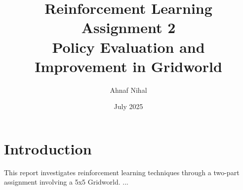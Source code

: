 \documentclass[12pt]{article}
\title{Reinforcement Learning Assignment 2\\\large Policy Evaluation and Improvement in Gridworld}
\author{Ahnaf Nihal}
\date{July 2025}
\begin{document}
\maketitle

\section*{Introduction}
This report investigates reinforcement learning techniques through a two-part assignment involving a 5x5 Gridworld. ...
\end{document}
